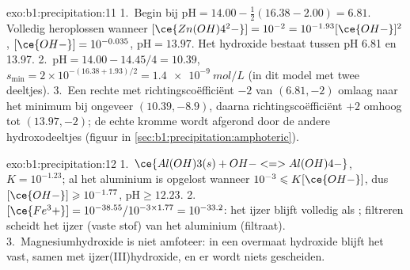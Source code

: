 \begin{solution}{exo:b1:precipitation:11}
1.~Begin bij $\mathrm{pH} = 14.00 - \frac12(16.38 - 2.00) = 6.81$.
Volledig heroplossen wanneer $[\ce{Zn(OH)4^2-}] = 10^{-2} = 10^{-1.93}[\ce{OH-}]^2$,
$[\ce{OH-}] = 10^{-0.035}$, $\mathrm{pH} = 13.97$. Het hydroxide bestaat
tussen pH 6.81 en 13.97.
2.~$\mathrm{pH} = 14.00 - 14.45/4 = 10.39$, $s_{\min} = 2 \times
10^{-(16.38 + 1.93)/2} = \qty{1.4e-9}{mol/L}$ (in dit model met twee
deeltjes).
3.~Een rechte met richtingscoëfficiënt $-2$ van $(6.81, -2)$ omlaag naar
het minimum bij ongeveer $(10.39, -8.9)$, daarna richtingscoëfficiënt
$+2$ omhoog tot $(13.97, -2)$; de echte kromme wordt afgerond door de
andere hydroxodeeltjes (figuur in \cref{sec:b1:precipitation:amphoteric}).
\end{solution}

\begin{solution}{exo:b1:precipitation:12}
1.~$\ce{Al(OH)3(s) + OH- <=> Al(OH)4-}$, $K = 10^{-1.23}$; al het
aluminium is opgelost wanneer $10^{-3} \leqslant K[\ce{OH-}]$, dus
$[\ce{OH-}] \geqslant 10^{-1.77}$, $\mathrm{pH} \geqslant 12.23$.
2.~$[\ce{Fe^3+}] = 10^{-38.55}/10^{-3 \times 1.77} = 10^{-33.2}$: het
ijzer blijft volledig als ; filtreren scheidt het ijzer
(vaste stof) van het aluminium (filtraat).
3.~Magnesiumhydroxide is niet amfoteer: in een overmaat hydroxide blijft
het vast, samen met ijzer(III)hydroxide, en er wordt niets gescheiden.
\end{solution}

